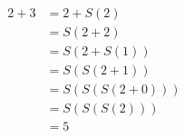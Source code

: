 \documentclass[preview]{standalone}
\begin{document}
\begin{align*}
2 + 3 &= 2 + S(2) \\ &= S(2 + 2) \\ &= S(2 + S(1)) \\ &= S(S(2 + 1)) \\ &= S(S(S(2 + 0))) \\ &= S(S(S(2))) \\ &= 5
\end{align*}
\end{document}
